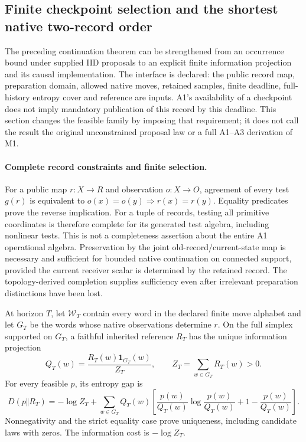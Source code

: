 \subsection{Finite checkpoint selection and the shortest native two-record order}
\label{sec:source-checkpoint-selection}

The preceding continuation theorem can be strengthened from an occurrence
bound under supplied IID proposals to an explicit finite information
projection and its causal implementation. The interface is declared:
the public record map, preparation domain, allowed native moves, retained
samples, finite deadline, full-history entropy cover and reference are
inputs. A1's availability of a checkpoint does not imply mandatory
publication of this record by this deadline. This section changes the
feasible family by imposing that requirement; it does not call the result
the original unconstrained proposal law or a full A1--A3 derivation of M1.

\paragraph{Complete record constraints and finite selection.}
For a public map $r:X\to R$ and observation $o:X\to O$, agreement of
every test $g(r)$ is equivalent to
$o(x)=o(y)\Rightarrow r(x)=r(y)$. Equality predicates prove the
reverse implication. For a tuple of records, testing all primitive
coordinates is therefore complete for its generated test algebra, including
nonlinear tests. This is not a completeness assertion about the entire A1
operational algebra. Preservation by the joint old-record/current-state
map is necessary and sufficient for bounded native continuation on connected
support, provided the current receiver scalar is determined by the retained
record. The topology-derived completion supplies sufficiency even after
irrelevant preparation distinctions have been lost.

At horizon $T$, let $\mathcal W_T$ contain every word in the declared
finite move alphabet and let $G_T$ be the words whose native observations
determine $r$. On the full simplex supported on $G_T$, a faithful inherited
reference $R_T$ has the unique information projection
\[
 Q_T(w)=\frac{R_T(w)\mathbf 1_{G_T}(w)}{Z_T},
 \qquad Z_T=\sum_{w\in G_T}R_T(w)>0.
\]
For every feasible $p$, its entropy gap is
\[
 D(p\Vert R_T)=-\log Z_T+
 \sum_{w\in G_T}Q_T(w)
 \left[\frac{p(w)}{Q_T(w)}\log\frac{p(w)}{Q_T(w)}
       +1-\frac{p(w)}{Q_T(w)}\right].
\]
Nonnegativity and the strict equality case prove uniqueness, including
candidate laws with zeros. The information cost is $-\log Z_T$.

